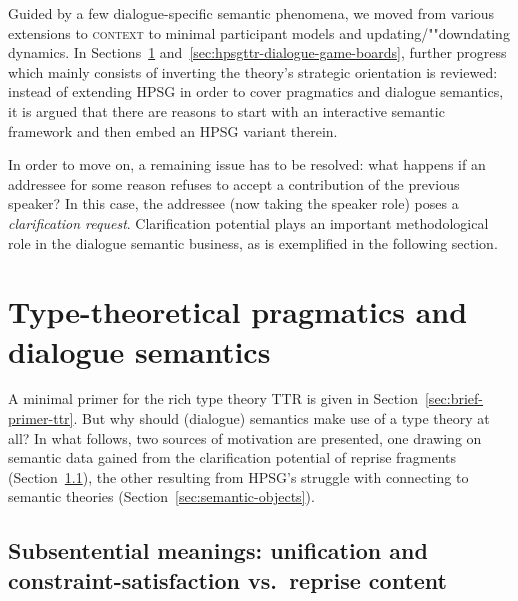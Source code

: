 \documentclass[output=paper,biblatex,babelshorthands,newtxmath,draftmode,colorlinks,citecolor=brown]{langscibook}
\begin{document}
\largerpage[2]
Guided by a few dialogue-specific semantic phenomena, we moved from various extensions to \textsc{context}  to minimal participant models and updating/""downdating dynamics.
%
In Sections~\ref{sec:type-theory-pragmatics-semantics} and~\ref{sec:hpsgttr-dialogue-game-boards}, further progress which mainly consists of inverting the theory's strategic orientation is reviewed: instead of extending HPSG in order to cover pragmatics and dialogue semantics, it is argued that there are reasons to start with an interactive semantic framework and then embed an HPSG variant therein.


In order to move on, a remaining issue has to be resolved: what happens if an addressee for some reason refuses to accept a contribution of the previous speaker?
%
In this case, the addressee (now taking the speaker role) poses a \emph{clarification request}.
%
Clarification potential plays an important methodological role in the dialogue semantic business, as is exemplified in the following section. %




\section{Type-theoretical pragmatics and dialogue semantics}
\label{sec:type-theory-pragmatics-semantics}

\largerpage[2]
A minimal primer for the rich type theory TTR is given in Section~\ref{sec:brief-primer-ttr}. 
%
But why should (dialogue) semantics make use of a type theory at all?
%
In what follows, two sources of motivation are presented, one drawing on semantic data gained from the clarification potential of reprise fragments (Section~\ref{sec:sub-sentential-meanings}), the other resulting from HPSG's struggle with connecting to semantic theories (Section~\ref{sec:semantic-objects}).



\subsection{Subsentential meanings: unification and constraint-satisfaction vs.\ reprise content}
\label{sec:sub-sentential-meanings}
\end{document}
